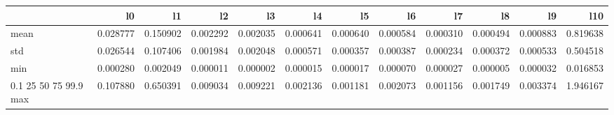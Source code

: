 \begin{tabular}{lrrrrrrrrrrr}
\toprule
 & l0 & l1 & l2 & l3 & l4 & l5 & l6 & l7 & l8 & l9 & l10 \\
\midrule
mean & 0.028777 & 0.150902 & 0.002292 & 0.002035 & 0.000641 & 0.000640 & 0.000584 & 0.000310 & 0.000494 & 0.000883 & 0.819638 \\
std & 0.026544 & 0.107406 & 0.001984 & 0.002048 & 0.000571 & 0.000357 & 0.000387 & 0.000234 & 0.000372 & 0.000533 & 0.504518 \\
min & 0.000280 & 0.002049 & 0.000011 & 0.000002 & 0.000015 & 0.000017 & 0.000070 & 0.000027 & 0.000005 & 0.000032 & 0.016853 \\
0.1%
25%
50%
75%
99.9%
max & 0.107880 & 0.650391 & 0.009034 & 0.009221 & 0.002136 & 0.001181 & 0.002073 & 0.001156 & 0.001749 & 0.003374 & 1.946167 \\
\bottomrule
\end{tabular}
